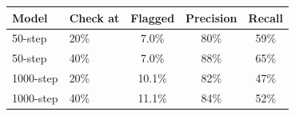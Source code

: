 \begin{tabular}{llccc}
\toprule
Model & Check at & Flagged & Precision & Recall \\
\midrule
50-step & 20\% & 7.0\% & 80\% & 59\% \\
50-step & 40\% & 7.0\% & 88\% & 65\% \\
1000-step & 20\% & 10.1\% & 82\% & 47\% \\
1000-step & 40\% & 11.1\% & 84\% & 52\% \\
\bottomrule
\end{tabular}
